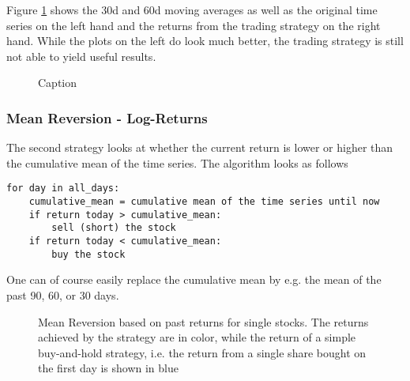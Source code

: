 Figure \ref{fig:30d_60d_plot} shows the 30d and 60d moving averages as well as the original time series on the left hand and the returns from the trading strategy on the right hand. While the plots on the left do look much better, the trading strategy is still not able to yield useful results. 

\begin{figure}[h!]
    \centering
    \begin{minipage}[b]{0.49\textwidth}
        \centering
            \begin{adjustbox}{width=\textwidth,center}
            \end{adjustbox}
    \end{minipage}
    \hfill
    \begin{minipage}[b]{0.49\textwidth}
        \centering
        \begin{adjustbox}{width=\textwidth,center}
            
        \end{adjustbox}
    \end{minipage}
    \caption{Caption}
    \label{fig:30d_60d_plot}
\end{figure}{}


\subsubsection{Mean Reversion - Log-Returns}
The second strategy looks at whether the current return is lower or higher than the cumulative mean of the time series. The algorithm looks as follows

\begin{verbatim}
for day in all_days: 
    cumulative_mean = cumulative mean of the time series until now
    if return today > cumulative_mean:
        sell (short) the stock
    if return today < cumulative_mean:
        buy the stock
\end{verbatim}

One can of course easily replace the cumulative mean by e.g. the mean of the past 90, 60, or 30 days. 

\begin{figure}[h!]
    \centering
    \begin{adjustbox}{width=.95\textwidth,center}
        
    \end{adjustbox}  
    \caption{Mean Reversion based on past returns for single stocks. The returns achieved by the strategy are in color, while the return of a simple buy-and-hold strategy, i.e. the return from a single share bought on the first day is shown in blue}
    \label{fig:mean_reversion_returns}
\end{figure}{}

